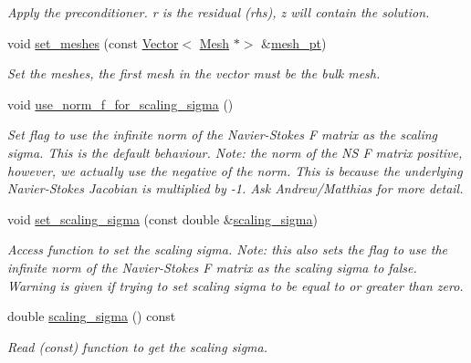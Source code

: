 \begin{DoxyCompactItemize}
\begin{DoxyCompactList}\small\item\em Apply the preconditioner. r is the residual (rhs), z will contain the solution. \end{DoxyCompactList}\item 
void \hyperlink{classoomph_1_1LagrangeEnforcedFlowPreconditioner_a8493d20c5e5d4bbdc3f1b3fd22de2ce3}{set\+\_\+meshes} (const \hyperlink{classoomph_1_1Vector}{Vector}$<$ \hyperlink{classoomph_1_1Mesh}{Mesh} $\ast$$>$ \&\hyperlink{classoomph_1_1BlockPreconditioner_a3c0e92cb77c3e3179007fe9fd99b6428}{mesh\+\_\+pt})
\begin{DoxyCompactList}\small\item\em Set the meshes, the first mesh in the vector must be the bulk mesh. \end{DoxyCompactList}\item 
void \hyperlink{classoomph_1_1LagrangeEnforcedFlowPreconditioner_a9a0db8be07c39ebb30f02e4461658efd}{use\+\_\+norm\+\_\+f\+\_\+for\+\_\+scaling\+\_\+sigma} ()
\begin{DoxyCompactList}\small\item\em Set flag to use the infinite norm of the Navier-\/\+Stokes F matrix as the scaling sigma. This is the default behaviour. Note\+: the norm of the NS F matrix positive, however, we actually use the negative of the norm. This is because the underlying Navier-\/\+Stokes Jacobian is multiplied by -\/1. Ask Andrew/\+Matthias for more detail. \end{DoxyCompactList}\item 
void \hyperlink{classoomph_1_1LagrangeEnforcedFlowPreconditioner_a14023f7ee6150f3b2ebdb0eab534242d}{set\+\_\+scaling\+\_\+sigma} (const double \&\hyperlink{classoomph_1_1LagrangeEnforcedFlowPreconditioner_a63ef6de02fbf4486ca99d2a560ff47a4}{scaling\+\_\+sigma})
\begin{DoxyCompactList}\small\item\em Access function to set the scaling sigma. Note\+: this also sets the flag to use the infinite norm of the Navier-\/\+Stokes F matrix as the scaling sigma to false. Warning is given if trying to set scaling sigma to be equal to or greater than zero. \end{DoxyCompactList}\item 
double \hyperlink{classoomph_1_1LagrangeEnforcedFlowPreconditioner_a63ef6de02fbf4486ca99d2a560ff47a4}{scaling\+\_\+sigma} () const
\begin{DoxyCompactList}\small\item\em Read (const) function to get the scaling sigma. \end{DoxyCompactList}\item 
$$
\end{DoxyCompactItemize}
